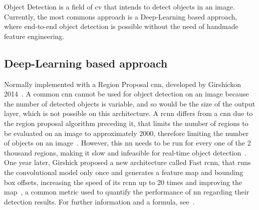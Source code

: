 Object Detection is a field of \acl{cv} that intends to detect objects in an image. Currently, the most commons approach is a Deep-Learning based approach, where end-to-end object detection is possible without the need of handmade feature engineering.




\subsection{Deep-Learning based approach}
Normally implemented with a Region Proposal \acf{cnn}, developed by Girshick\etal on 2014~\cite{Girshick2014}. A common \ac{cnn} cannot be used for object detection on an image because the number of detected objects is variable, and so would be the size of the output layer, which is not possible on this architecture. A \ac{rcnn} differs from a \ac{cnn} due to the region proposal algorithm preceding it, that limits the number of regions to be evaluated on an image to approximately 2000, therefore limiting the number of objects on an image~\cite{Girshick2014}. However, this \acl{nn} needs to be run for every one of the 2 thousand regions, making it slow and infeasible for real-time object detection~\cite{Girshick2014}. One year later, Girshick proposed a new architecture called Fast \ac{rcnn}, that runs the convolutional model only once and generates a feature map and bounding box offsets, increasing the speed of its \ac{rcnn} up to 20 times and improving the \ac{map}~\cite{Girshick2015}, a common metric used to quantify the performance of \ac{nn} regarding their detection results. For further information and a formula, see~\cite{mAP, AP}.

